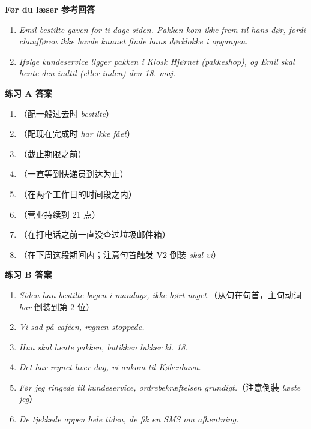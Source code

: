 \begin{answerbox}
\textbf{Før du læser 参考回答}
\begin{enumerate}
  \item \textit{Emil bestilte gaven for ti dage siden. Pakken kom ikke frem til hans dør, fordi chaufføren ikke havde kunnet finde hans dørklokke i opgangen.}
  \item \textit{Ifølge kundeservice ligger pakken i Kiosk Hjørnet (pakkeshop), og Emil skal hente den indtil (eller inden) den 18. maj.}
\end{enumerate}

\textbf{练习 A 答案}
\begin{enumerate}
  \item {}（配一般过去时 \textit{bestilte}）
  \item {}（配现在完成时 \textit{har ikke fået}）
  \item {}（截止期限之前）
  \item {}（一直等到快递员到达为止）
  \item {}（在两个工作日的时间段之内）
  \item {}（营业持续到 21 点）
  \item {}（在打电话之前一直没查过垃圾邮件箱）
  \item {}（在下周这段期间内；注意句首触发 V2 倒装 \textit{skal vi}）
\end{enumerate}

\textbf{练习 B 答案}
\begin{enumerate}
  \item \textit{Siden han bestilte bogen i mandags,  ikke hørt noget.}（从句在句首，主句动词 \textit{har} 倒装到第 2 位）
  \item \textit{Vi sad på caféen,  regnen stoppede.}
  \item \textit{Hun skal hente pakken,  butikken lukker kl. 18.}
  \item \textit{Det har regnet hver dag,  vi ankom til København.}
  \item \textit{Før jeg ringede til kundeservice,  ordrebekræftelsen grundigt.}（注意倒装 \textit{læste jeg}）
  \item \textit{De tjekkede appen hele tiden,  de fik en SMS om afhentning.}
\end{enumerate}


\end{answerbox}
